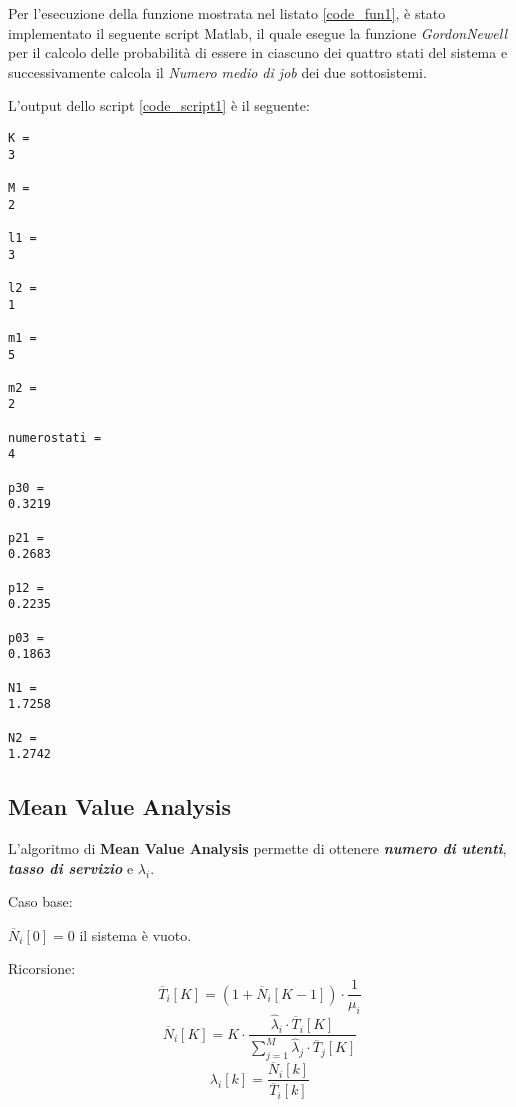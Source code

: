 Per l'esecuzione della funzione mostrata nel listato \ref{code_fun1}, è stato implementato
il seguente script Matlab, il quale esegue la funzione \textit{GordonNewell}
per il calcolo delle probabilità di essere in ciascuno dei quattro stati del sistema
e successivamente calcola il \textit{Numero medio di job} dei due sottosistemi.\\

\clearpage



\vspace{0.4cm}
L'output dello script \ref{code_script1} è il seguente:

\color{black} \begin{verbatim}
K =
3

M =
2

l1 =
3

l2 =
1

m1 =
5

m2 =
2

numerostati =
4

p30 =
0.3219

p21 =
0.2683

p12 =
0.2235

p03 =
0.1863

N1 =
1.7258

N2 =
1.2742
\end{verbatim} \color{black}

\subsection{Mean Value Analysis}
L'algoritmo di \textbf{Mean Value Analysis} permette di ottenere \textbf{\textit{numero di utenti}},
\textbf{\textit{tasso di servizio}} e \textbf{\textit{$\lambda_i$}}.

\vspace{0.3cm}

Caso base:\\
 \begin{center}
   $\overline{N}_i[0]=0  $ il sistema è vuoto.
 \end{center}

\vspace{0.2cm}

Ricorsione:
$$ \overline{T}_i[K]=(1+\overline{N}_i[K-1])\cdot \frac{1}{\mu_i}$$
$$ \overline{N}_i[K]=K\cdot \frac{\widehat{\lambda}_i\cdot \overline{T}_i[K]}{\sum_{j=1}^M \widehat{\lambda}_j \cdot \overline{T}_j[K]}$$
$$ \lambda_i[k]=\frac{\overline{N}_i[k]}{\overline{T}_i[k]}$$
\clearpage
